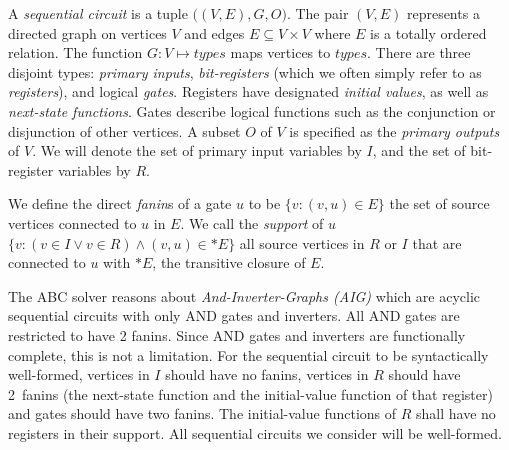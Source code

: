 \begin{definition}
\rm A {\em sequential circuit} is a tuple $\big( (V, E),G,
O\big)$.  The pair $(V,E)$ represents a directed graph on
vertices $V$ and edges $E \subseteq V\times V$ where $E$
is a totally ordered relation.  The function $G: V \mapsto
{\mathit types}$ maps vertices to ${\mathit types}$.
There are three disjoint types: {\em primary inputs}, {\em
bit-registers} (which we often simply refer to as {\em
registers}), and logical {\em gates}.  Registers have designated
{\em initial values}, as well as {\em next-state
functions}.  Gates describe logical functions such as
the conjunction or disjunction of other vertices. 
A subset $O$ of $V$ is specified as the {\em
primary outputs} of $V$.  
We will denote the set of primary input variables by $I$,
and the set of bit-register variables by $R$.  
\label{def:back:seq_circuit}
\end{definition}

\begin{definition}[Fanins]
\rm We define the direct {\em fanin}s of a gate $u$ to be
$\{v: (v,u)\in E\}$ the set of source vertices connected
to $u$ in $E$.  We call the {\em support} of $u$ $\{v:
(v\in I \vee v \in R) \wedge (v,u) \in \ast E\}$ all
source vertices in $R$ or $I$ that are connected to $u$
with $\ast E$, the transitive closure of $E$.
\label{def:back:fanins} 
\end{definition}


The ABC solver reasons about {\em And-Inverter-Graphs (AIG)}
which are acyclic sequential circuits with only AND gates and inverters.
All AND gates are restricted to have 2 fanins. 
Since AND gates and inverters are functionally complete, 
this is not a limitation. 
For the sequential
circuit to be syntactically well-formed, vertices in $I$
should have no fanins, vertices in $R$ should have
2~fanins (the next-state function and the initial-value
function of that register) and gates should have two fanins.
The initial-value functions
of $R$ shall have no registers in their support.  
All sequential circuits we consider will be well-formed. 


